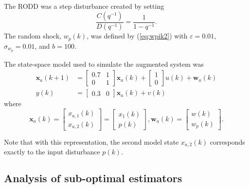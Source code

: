 The \gls{RODD} was a step disturbance created by setting
\begin{equation}
	\frac{C(q^{-1})}{D(q^{-1})} = \frac{1}{1-q^{-1}}.
\end{equation}
The random shock, $w_p(k)$, was defined by (\ref{eq:wpik2}) with $\varepsilon=0.01$, $\sigma_{w_p}=0.01$, and $b=100$.

The state-space model used to simulate the augmented system was
\begin{equation} \label{eq:sim-sys-siso-ss-aug}
	\begin{split}
	\mathbf{x}_{a}(k+1) & =\left[\begin{array}{cc}
		0.7 & 1 \\
		0 & 1
	\end{array}\right] \mathbf{x}_{a}(k)+\left[\begin{array}{l}
		1 \\
		0
	\end{array}\right] u(k) + \mathbf{w}_{a}(k) \\
	y(k) & =\left[\begin{array}{cc}
	0.3 & 0
\end{array}\right] \mathbf{x}_{a}(k) + v(k)
\end{split}
\end{equation}
where
\begin{equation} \label{eq:sim-sys-siso-ss-aug2}
		\mathbf{x}_{a}(k) = \left[\begin{array}{l}
			x_{a,1}(k) \\
			x_{a,2}(k)
		\end{array}\right] = \left[\begin{array}{l}
		x_{1}(k) \\
		p(k)
	\end{array}\right], \mathbf{w}_{a}(k) = \left[\begin{array}{l}
	w(k) \\
	w_{p}(k)
\end{array}\right] .
\end{equation}

Note that with this representation, the second model state $x_{a,2}(k)$ corresponds exactly to the input disturbance $p(k)$.

\subsection{Analysis of sub-optimal estimators} \label{sec:sim-obs-lin-1-SKF-analysis}

